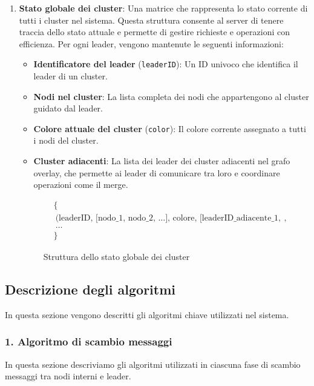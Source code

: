 \documentclass[12pt, a4paper]{report}
\begin{document}
\begin{enumerate}
    \item \textbf{Stato globale dei cluster}: Una matrice che rappresenta lo stato corrente di tutti i cluster nel sistema. Questa struttura consente al server di tenere traccia dello stato attuale e permette di gestire richieste e operazioni con efficienza. Per ogni leader, vengono mantenute le seguenti informazioni:
    \begin{itemize}
        \item \textbf{Identificatore del leader} (\texttt{leaderID}): Un ID univoco che identifica il leader di un cluster.
        \item \textbf{Nodi nel cluster}: La lista completa dei nodi che appartengono al cluster guidato dal leader.
        \item \textbf{Colore attuale del cluster} (\texttt{color}): Il colore corrente assegnato a tutti i nodi del cluster.
        \item \textbf{Cluster adiacenti}: La lista dei leader dei cluster adiacenti nel grafo overlay, che permette ai leader di comunicare tra loro e coordinare operazioni come il merge.
    \end{itemize}
    \vspace{-20pt}
    \begin{figure}[H]
    \begin{align*}
            &\{ \\
            &\ \text{(leaderID, [nodo\_1, nodo\_2, \ldots], colore, [leaderID\_adiacente\_1, leaderID\_adiacente\_2, \ldots])}, \\
            &\ \ldots \\
            &\}
        \end{align*}
        \vspace{-20pt}
        \caption{Struttura dello stato globale dei cluster}
        \label{fig:global_cluster_state}
    \end{figure}

\end{enumerate}

\subsection{Descrizione degli algoritmi}

In questa sezione vengono descritti gli algoritmi chiave utilizzati nel sistema.

\subsubsection{1. Algoritmo di scambio messaggi}
\label{sec:change_colore}
In questa sezione descriviamo gli algoritmi utilizzati in ciascuna fase di scambio messaggi tra nodi interni e leader.
\end{document}
